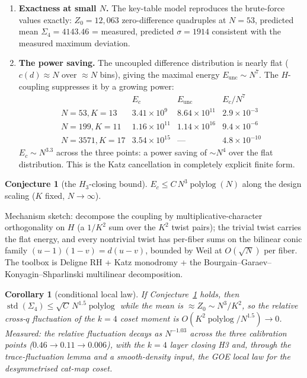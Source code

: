 \documentclass[11pt,reqno]{amsart}
\newtheorem{corollary}[theorem]{Corollary}
\theoremstyle{definition}
\newtheorem{conjecture}[theorem]{Conjecture}
\begin{document}
\begin{enumerate}
\item \textbf{Exactness at small $N$.}  The key-table model reproduces
the brute-force values exactly: $Z_0 = 12{,}063$ zero-difference
quadruples at $N = 53$, predicted mean
$\Sigma_4 = 4143.46$ = measured, predicted $\sigma = 1914$ consistent
with the measured maximum deviation.
\item \textbf{The power saving.}  The uncoupled difference distribution
is nearly flat ($c(d) \approx N$ over $\approx N$ bins), giving the
maximal energy $E_{\mathrm{unc}} \sim N^7$.  The $H$-coupling
suppresses it by a growing power:
\[
\begin{array}{lccc}
 & E_c & E_{\mathrm{unc}} & E_c/N^7\\
N = 53, K = 13 & 3.41 \times 10^9 & 8.64 \times 10^{11} & 2.9 \times 10^{-3}\\
N = 199, K = 11 & 1.16 \times 10^{11} & 1.14 \times 10^{16} & 9.4 \times 10^{-6}\\
N = 3571, K = 17 & 3.54 \times 10^{15} & \text{—} & 4.8 \times 10^{-10}
\end{array}
\]
$E_c \sim N^{3.3}$ across the three points: a power saving of $\sim
N^4$ over the flat distribution.  This is the Katz cancellation in
completely explicit finite form.
\end{enumerate}

\begin{conjecture}[the $H_3$-closing bound]
\label{conj:Ec}
$E_c \le C\, N^3 \operatorname{polylog}(N)$ along the design scaling
($K$ fixed, $N \to \infty$).
\end{conjecture}

Mechanism sketch: decompose the coupling by multiplicative-character
orthogonality on $H$ (a $1/K^2$ sum over the $K^2$ twist pairs); the
trivial twist carries the flat energy, and every nontrivial twist has
per-fiber sums on the bilinear conic family
$(u{-}1)(1{-}v) = d(u{-}v)$, bounded by Weil at $O(\sqrt{N})$ per
fiber.  The toolbox is Deligne RH + Katz monodromy + the
Bourgain--Garaev--Konyagin--Shparlinski multilinear decomposition.

\begin{corollary}[conditional local law]
If Conjecture~\ref{conj:Ec} holds, then
$\operatorname{std}(\Sigma_4) \le \sqrt{C}\, N^{1.5}
\operatorname{polylog}$ while the mean is $\approx Z_0 \sim N^3/K^2$,
so the relative cross-$q$ fluctuation of the $k{=}4$ coset moment is
$O(K^2 \operatorname{polylog}/N^{1.5}) \to 0$.  Measured: the relative
fluctuation decays as $N^{-1.03}$ across the three calibration points
($0.46 \to 0.11 \to 0.006$), with the $k{=}4$ layer closing H3 and,
through the trace-fluctuation lemma and a smooth-density input, the
GOE local law for the desymmetrised cat-map coset.
\end{corollary}
\end{document}
